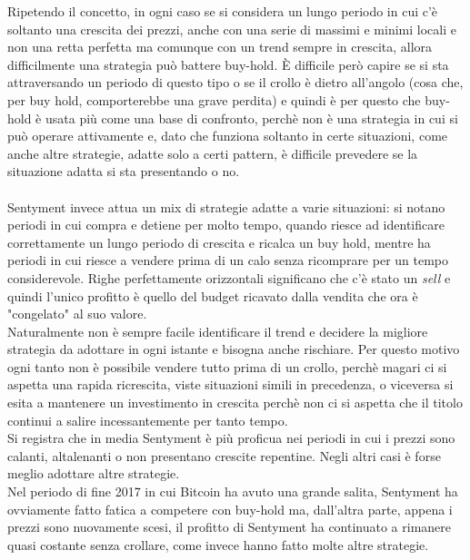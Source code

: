\documentclass[a4paper,12pt]{report}
\begin{document}
\begin{fig}
Ripetendo il concetto, in ogni caso se si considera un lungo periodo in cui c'è soltanto una crescita dei prezzi, anche con una serie di massimi e minimi locali e non una retta perfetta ma comunque con un trend sempre in crescita, allora difficilmente una strategia può battere buy-hold. È difficile però capire se si sta attraversando un periodo di questo tipo o se il crollo è dietro all'angolo (cosa che, per buy hold, comporterebbe una grave perdita) e quindi è per questo che buy-hold è usata più come una base di confronto, perchè non è una strategia in cui si può operare attivamente e, dato che funziona soltanto in certe situazioni, come anche altre strategie, adatte solo a certi pattern, è difficile prevedere se la situazione adatta si sta presentando o no.\\~\\ Sentyment invece attua un mix di strategie adatte a varie situazioni: si notano periodi in cui compra e detiene per molto tempo, quando riesce ad identificare correttamente un lungo periodo di crescita e ricalca un buy hold, mentre ha periodi in cui riesce a vendere prima di un calo senza ricomprare per un tempo considerevole. Righe perfettamente orizzontali significano che c'è stato un \textit{sell} e quindi l'unico profitto è quello del budget ricavato dalla vendita che ora è "congelato" al suo valore.\\ Naturalmente non è sempre facile identificare il trend e decidere la migliore strategia da adottare in ogni istante e bisogna anche rischiare. Per questo motivo ogni tanto non è possibile vendere tutto prima di un crollo, perchè magari ci si aspetta una rapida ricrescita, viste situazioni simili in precedenza, o viceversa si esita a mantenere un investimento in crescita perchè non ci si aspetta che il titolo continui a salire incessantemente per tanto tempo.\\ Si registra che in media Sentyment è più proficua nei periodi in cui i prezzi sono calanti, altalenanti o non presentano crescite repentine. Negli altri casi è forse meglio adottare altre strategie.\\ Nel periodo di fine 2017 in cui Bitcoin ha avuto una grande salita, Sentyment ha ovviamente fatto fatica a competere con buy-hold ma, dall'altra parte, appena i prezzi sono nuovamente scesi, il profitto di Sentyment ha continuato a rimanere quasi costante senza crollare, come invece hanno fatto molte altre strategie.\\~\\
\begin{fig}

\end{fig}
\end{fig}
\end{document}
